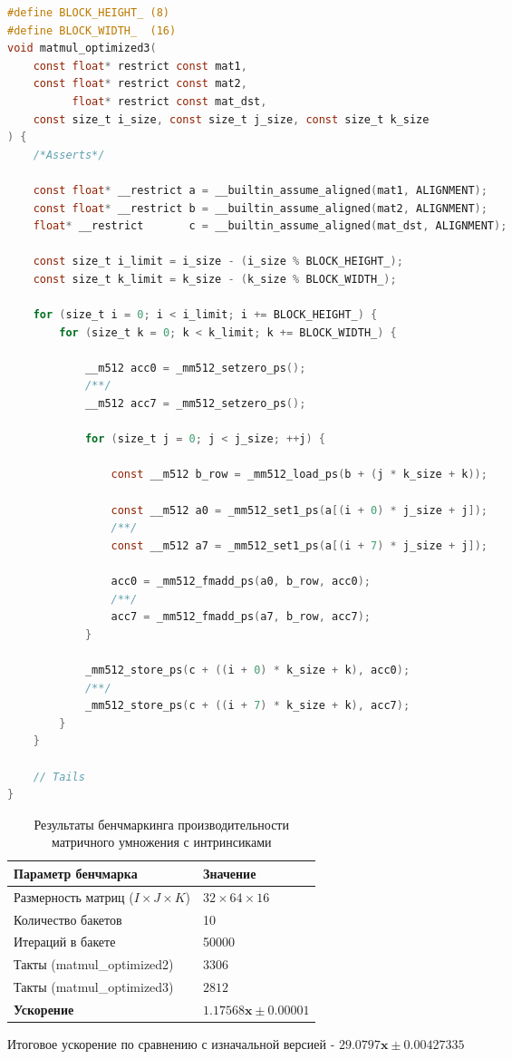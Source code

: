\documentclass[12pt]{extarticle}
\begin{document}
\begin{lstlisting}[language=C]
#define BLOCK_HEIGHT_ (8)
#define BLOCK_WIDTH_  (16)
void matmul_optimized3(
    const float* restrict const mat1, 
    const float* restrict const mat2, 
          float* restrict const mat_dst,
    const size_t i_size, const size_t j_size, const size_t k_size
) {
    /*Asserts*/

    const float* __restrict a = __builtin_assume_aligned(mat1, ALIGNMENT);
    const float* __restrict b = __builtin_assume_aligned(mat2, ALIGNMENT);
    float* __restrict       c = __builtin_assume_aligned(mat_dst, ALIGNMENT);

    const size_t i_limit = i_size - (i_size % BLOCK_HEIGHT_);
    const size_t k_limit = k_size - (k_size % BLOCK_WIDTH_);

    for (size_t i = 0; i < i_limit; i += BLOCK_HEIGHT_) {
        for (size_t k = 0; k < k_limit; k += BLOCK_WIDTH_) {
            
            __m512 acc0 = _mm512_setzero_ps(); 
            /**/
            __m512 acc7 = _mm512_setzero_ps();

            for (size_t j = 0; j < j_size; ++j) {
                
                const __m512 b_row = _mm512_load_ps(b + (j * k_size + k));

                const __m512 a0 = _mm512_set1_ps(a[(i + 0) * j_size + j]);
                /**/
                const __m512 a7 = _mm512_set1_ps(a[(i + 7) * j_size + j]);

                acc0 = _mm512_fmadd_ps(a0, b_row, acc0);
                /**/
                acc7 = _mm512_fmadd_ps(a7, b_row, acc7);
            }

            _mm512_store_ps(c + ((i + 0) * k_size + k), acc0);
            /**/
            _mm512_store_ps(c + ((i + 7) * k_size + k), acc7);
        }
    }

    // Tails
}
\end{lstlisting}

\begin{table}[h!]
\centering
\begin{tabular}{|l|l|}
\hline
\textbf{Параметр бенчмарка} & \textbf{Значение} \\ \hline
Размерность матриц ($I \times J \times K$) & $32 \times 64 \times 16$ \\ \hline
Количество бакетов & 10 \\ \hline
Итераций в бакете & 50000 \\ \hline
Такты (matmul\_optimized2) & $3306$ \\ \hline
Такты (matmul\_optimized3) & $2812$ \\ \hline
\textbf{Ускорение} & $\mathbf{1.17568x \pm 0.00001}$ \\ \hline
\end{tabular}
\caption{Результаты бенчмаркинга производительности матричного умножения с интринсиками}
\label{table:matmul_bench}
\end{table}

Итоговое ускорение по сравнению с изначальной версией - $\mathbf{29.0797x \pm 0.00427335}$
 
\end{document}
